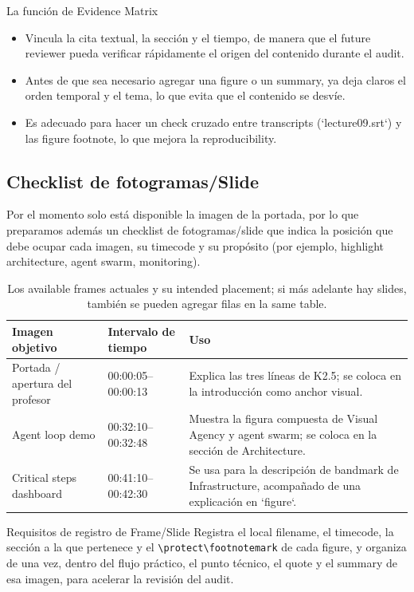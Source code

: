 \documentclass[a4paper]{article}
\begin{document}
\begin{knowledgebox}{La función de Evidence Matrix}
\begin{itemize}
    \item Vincula la cita textual, la sección y el tiempo, de manera que el future reviewer pueda verificar rápidamente el origen del contenido durante el audit.
    \item Antes de que sea necesario agregar una figure o un summary, ya deja claros el orden temporal y el tema, lo que evita que el contenido se desvíe.
    \item Es adecuado para hacer un check cruzado entre transcripts (`lecture09.srt`) y las figure footnote, lo que mejora la reproducibility.
\end{itemize}
\end{knowledgebox}

\subsection{Checklist de fotogramas/Slide}
Por el momento solo está disponible la imagen de la portada, por lo que preparamos además un checklist de fotogramas/slide que indica la posición que debe ocupar cada imagen, su timecode y su propósito (por ejemplo, highlight architecture, agent swarm, monitoring).

\begin{table}[H]
\footnotesize
\centering
\begin{tabular}{p{3cm}p{4cm}p{5cm}}
\toprule
Imagen objetivo & Intervalo de tiempo & Uso \\
\midrule
Portada / apertura del profesor & 00:00:05--00:00:13 & Explica las tres líneas de K2.5; se coloca en la introducción como anchor visual. \\
Agent loop demo & 00:32:10--00:32:48 & Muestra la figura compuesta de Visual Agency y agent swarm; se coloca en la sección de Architecture. \\
Critical steps dashboard & 00:41:10--00:42:30 & Se usa para la descripción de bandmark de Infrastructure, acompañado de una explicación en `figure`. \\
\bottomrule
\end{tabular}
\caption{Los available frames actuales y su intended placement; si más adelante hay slides, también se pueden agregar filas en la same table.}
\end{table}

\begin{importantbox}{Requisitos de registro de Frame/Slide}
Registra el local filename, el timecode, la sección a la que pertenece y el \verb|\protect\footnotemark| de cada figure, y organiza de una vez, dentro del flujo práctico, el punto técnico, el quote y el summary de esa imagen, para acelerar la revisión del audit.
\end{importantbox}
\end{document}
